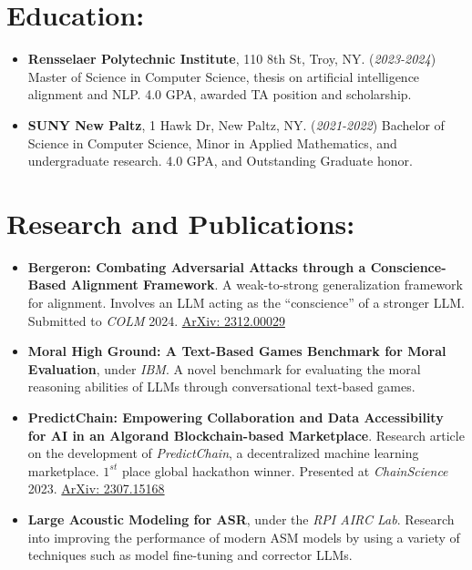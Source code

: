 \documentclass[12pt]{article}
\begin{document}
\section*{Education:}
\begin{itemize}
    \itemsep0em
    \item \textbf{Rensselaer Polytechnic Institute}, 110 8th St, Troy, NY. (\textit{2023-2024}) Master of Science in Computer Science, thesis on artificial intelligence alignment and NLP.  4.0 GPA, awarded TA position and scholarship.
    \item \textbf{SUNY New Paltz}, 1 Hawk Dr, New Paltz, NY. (\textit{2021-2022}) Bachelor of Science in Computer Science, Minor in Applied Mathematics, and undergraduate research. 4.0 GPA, and Outstanding Graduate honor.
\end{itemize}

\section*{Research and Publications:}
\begin{itemize}
    \itemsep0em
    
    \item \textbf{Bergeron: Combating Adversarial Attacks through a Conscience-Based Alignment Framework}.  A weak-to-strong generalization framework for alignment.  Involves an LLM acting as the ``conscience'' of a stronger LLM.  Submitted to \textit{COLM} 2024.  \href{https://arxiv.org/abs/2312.00029}{ArXiv: 2312.00029}
    
    \item \textbf{Moral High Ground: A Text-Based Games Benchmark for Moral Evaluation}, under \textit{IBM}.  A novel benchmark for evaluating the moral reasoning abilities of LLMs through conversational text-based games.
    
    \item \textbf{PredictChain: Empowering Collaboration and Data Accessibility for AI in an Algorand Blockchain-based Marketplace}.  Research article on the development of \textit{PredictChain}, a decentralized machine learning marketplace.  $1^{st}$ place global hackathon winner.  Presented at \textit{ChainScience} 2023. \href{https://arxiv.org/abs/2307.15168}{ArXiv: 2307.15168}
    
    \item \textbf{Large Acoustic Modeling for ASR}, under the \textit{RPI AIRC Lab}. Research into improving the performance of modern ASM models by using a variety of techniques such as model fine-tuning and corrector LLMs.
    
\end{itemize}
\end{document}

